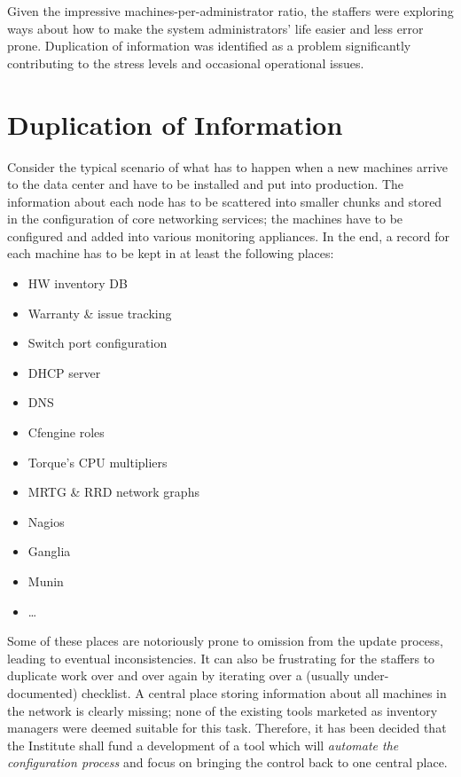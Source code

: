 \documentclass[a4paper]{jpconf}
\begin{document}
Given the impressive machines-per-administrator ratio, the staffers were exploring ways about how to make the system administrators'
life easier and less error prone.  Duplication of information was identified as a problem significantly contributing to the stress
levels and occasional operational issues.

\section{Duplication of Information}

Consider the typical scenario of what has to happen when a new machines arrive to the data center and have to be installed and put into
production.  The information about each node has to be scattered into smaller chunks and stored in the configuration of core networking
services; the machines have to be configured and added into various monitoring appliances.  In the end, a record for each machine has
to be kept in at least the following places:

\begin{itemize}
    \item HW inventory DB
    \item Warranty \& issue tracking
    \item Switch port configuration
    \item DHCP server
    \item DNS
    \item Cfengine roles
    \item Torque's CPU multipliers
    \item MRTG \& RRD network graphs
    \item Nagios
    \item Ganglia
    \item Munin
    \item \ldots
\end{itemize}

Some of these places are notoriously prone to omission from the update process, leading to eventual inconsistencies.  It can also be
frustrating for the staffers to duplicate work over and over again by iterating over a (usually under-documented) checklist.  A central
place storing information about all machines in the network is clearly missing; none of the existing tools marketed as inventory
managers were deemed suitable for this task.  Therefore, it has been decided that the Institute shall fund a development of a tool
which will {\em automate the configuration process} and focus on bringing the control back to one central place.
\end{document}
